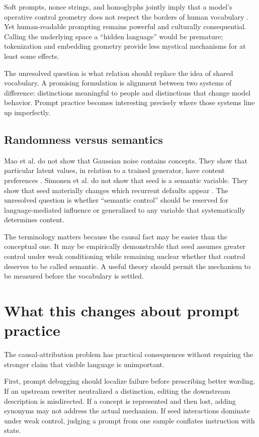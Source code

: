 \documentclass[11pt]{article}
\begin{document}
Soft prompts, nonce strings, and homoglyphs jointly imply that a model's operative control geometry does not respect the borders of human vocabulary \citep{QinEisner2021SoftPrompts,Milliere2022MadeUpWords,Struppek2023Homoglyphs}. Yet human-readable prompting remains powerful and culturally consequential. Calling the underlying space a ``hidden language'' would be premature; tokenization and embedding geometry provide less mystical mechanisms for at least some effects.

The unresolved question is what relation should replace the idea of shared vocabulary. A promising formulation is alignment between two systems of difference: distinctions meaningful to people and distinctions that change model behavior. Prompt practice becomes interesting precisely where those systems line up imperfectly.

\subsection{Randomness versus semantics}

Mao et al. do not show that Gaussian noise contains concepts. They show that particular latent values, in relation to a trained generator, have content preferences \citep{Mao2023InitialImageEditing}. Simonen et al. do not show that seed is a semantic variable. They show that seed materially changes which recurrent defaults appear \citep{Simonen2026DefaultImages}. The unresolved question is whether ``semantic control'' should be reserved for language-mediated influence or generalized to any variable that systematically determines content.

The terminology matters because the causal fact may be easier than the conceptual one. It may be empirically demonstrable that seed assumes greater control under weak conditioning while remaining unclear whether that control deserves to be called semantic. A useful theory should permit the mechanism to be measured before the vocabulary is settled.

\section{What this changes about prompt practice}

The causal-attribution problem has practical consequences without requiring the stronger claim that visible language is unimportant.

First, prompt debugging should localize failure before prescribing better wording. If an upstream rewriter neutralized a distinction, editing the downstream description is misdirected. If a concept is represented and then lost, adding synonyms may not address the actual mechanism. If seed interactions dominate under weak control, judging a prompt from one sample conflates instruction with state.
\end{document}
